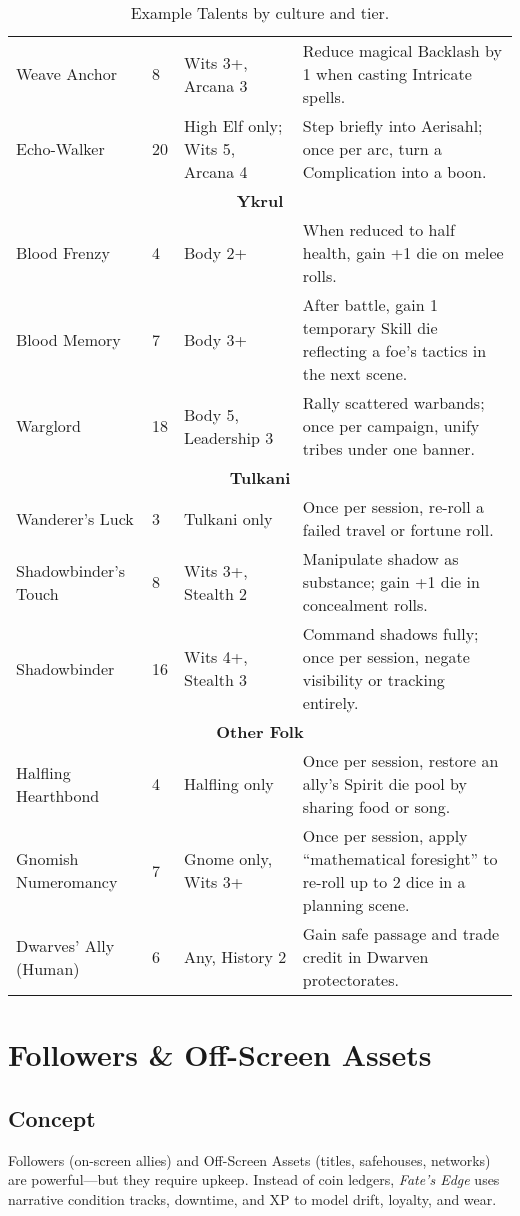 \documentclass[12pt]{book}
\begin{document}
\begin{table}[h]
\begin{tabular}{|p{3cm}|p{2cm}|p{3cm}|p{6cm}|}
Weave Anchor & 8 & Wits 3+, Arcana 3 & Reduce magical Backlash by 1 when casting Intricate spells. \\
Echo-Walker & 20 & High Elf only; Wits 5, Arcana 4 & Step briefly into Aerisahl; once per arc, turn a Complication into a boon. \\
\hline
\multicolumn{4}{|c|}{\textbf{Ykrul}} \\
\hline
Blood Frenzy & 4 & Body 2+ & When reduced to half health, gain +1 die on melee rolls. \\
Blood Memory & 7 & Body 3+ & After battle, gain 1 temporary Skill die reflecting a foe’s tactics in the next scene. \\
Warglord & 18 & Body 5, Leadership 3 & Rally scattered warbands; once per campaign, unify tribes under one banner. \\
\hline
\multicolumn{4}{|c|}{\textbf{Tulkani}} \\
\hline
Wanderer’s Luck & 3 & Tulkani only & Once per session, re-roll a failed travel or fortune roll. \\
Shadowbinder’s Touch & 8 & Wits 3+, Stealth 2 & Manipulate shadow as substance; gain +1 die in concealment rolls. \\
Shadowbinder & 16 & Wits 4+, Stealth 3 & Command shadows fully; once per session, negate visibility or tracking entirely. \\
\hline
\multicolumn{4}{|c|}{\textbf{Other Folk}} \\
\hline
Halfling Hearthbond & 4 & Halfling only & Once per session, restore an ally’s Spirit die pool by sharing food or song. \\
Gnomish Numeromancy & 7 & Gnome only, Wits 3+ & Once per session, apply “mathematical foresight” to re-roll up to 2 dice in a planning scene. \\
Dwarves’ Ally (Human) & 6 & Any, History 2 & Gain safe passage and trade credit in Dwarven protectorates. \\
\hline
\end{tabular}
\caption{Example Talents by culture and tier.}
\end{table}

\chapter{Followers \& Off-Screen Assets}
\label{chap:followers-assets}

\section{Concept}
Followers (on-screen allies) and Off-Screen Assets (titles, safehouses, networks) are powerful—but they require upkeep. Instead of coin ledgers, \emph{Fate’s Edge} uses narrative condition tracks, downtime, and XP to model drift, loyalty, and wear.
\end{document}
